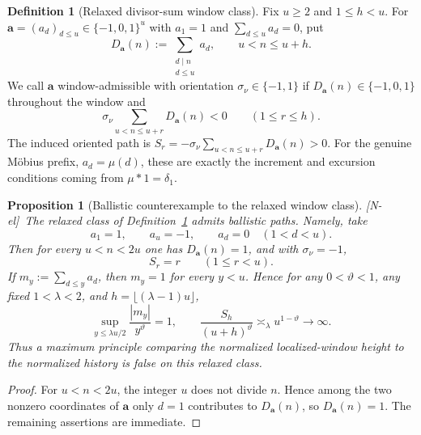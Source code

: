 \documentclass[11pt,reqno]{amsart}
\numberwithin{equation}{section}
\theoremstyle{plain}
\newtheorem{proposition}[theorem]{Proposition}
\theoremstyle{definition}
\newtheorem{definition}[theorem]{Definition}
\theoremstyle{remark}
\newcommand{\tagNE}{\textup{[N-el]}}
\begin{document}
\begin{definition}[Relaxed divisor-sum window class]
\label{def:relaxed-divisor-cone}
Fix $u\ge2$ and $1\le h<u$.  For
$\mathbf a=(a_d)_{d\le u}\in\{-1,0,1\}^u$ with $a_1=1$ and
$\sum_{d\le u}a_d=0$, put
\begin{equation}
D_{\mathbf a}(n):=\sum_{\substack{d\mid n\\ d\le u}}a_d,
\qquad u<n\le u+h.
\end{equation}
We call $\mathbf a$ window-admissible with orientation $\sigma_\nu\in\{-1,1\}$ if
$D_{\mathbf a}(n)\in\{-1,0,1\}$ throughout the window and
\begin{equation}
\sigma_\nu\sum_{u<n\le u+r}D_{\mathbf a}(n)<0
\qquad(1\le r\le h).
\end{equation}
The induced oriented path is
$S_r=-\sigma_\nu\sum_{u<n\le u+r}D_{\mathbf a}(n)>0$.
For the genuine M\"obius prefix, $a_d=\mu(d)$, these are exactly the
increment and excursion conditions coming from $\mu*1=\delta_1$.
\end{definition}

\begin{proposition}[Ballistic counterexample to the relaxed window class]
\label{prop:relaxed-ballistic}
\tagNE\ The relaxed class of Definition~\ref{def:relaxed-divisor-cone} admits
ballistic paths.  Namely, take
\begin{equation}
a_1=1,\qquad a_u=-1,\qquad a_d=0\quad(1<d<u).
\end{equation}
Then for every $u<n<2u$ one has $D_{\mathbf a}(n)=1$, and with $\sigma_\nu=-1$,
\begin{equation}
S_r=r\qquad(1\le r<u).
\end{equation}
If $m_y:=\sum_{d\le y}a_d$, then $m_y=1$ for every $y<u$.  Hence for
any $0<\vartheta<1$, any fixed $1<\lambda<2$, and
$h=\lfloor(\lambda-1)u\rfloor$,
\begin{equation}
\sup_{y\le\lambda u/2}\frac{|m_y|}{y^\vartheta}=1,
\qquad
\frac{S_h}{(u+h)^\vartheta}\asymp_\lambda u^{1-\vartheta}\longrightarrow\infty.
\end{equation}
Thus a maximum principle comparing the normalized localized-window height
to the normalized history is false on this relaxed class.
\end{proposition}

\begin{proof}
For $u<n<2u$, the integer $u$ does not divide $n$.  Hence among the two
nonzero coordinates of $\mathbf a$ only $d=1$ contributes to $D_{\mathbf a}(n)$,
so $D_{\mathbf a}(n)=1$.  The remaining assertions are immediate.
\end{proof}
\end{document}
